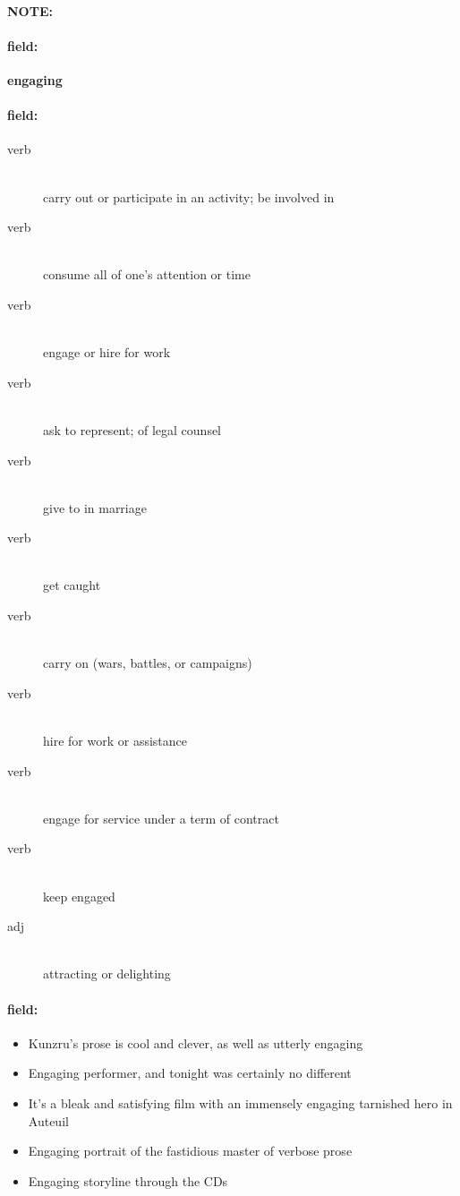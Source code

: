 \documentclass[12pt]{article}
\newenvironment{note}{\paragraph{NOTE:}}{}
\newenvironment{field}{\paragraph{field:}}{}
\begin{document}
\begin{note}
\begin{field}
\textbf{\large engaging}
\end{field}


\begin{field}
\begin{description}
\item[verb] \hfill \\ 
carry out or participate in an activity; be involved in

\item[verb] \hfill \\ 
consume all of one's attention or time

\item[verb] \hfill \\ 
engage or hire for work

\item[verb] \hfill \\ 
ask to represent; of legal counsel

\item[verb] \hfill \\ 
give to in marriage

\item[verb] \hfill \\ 
get caught

\item[verb] \hfill \\ 
carry on (wars, battles, or campaigns)

\item[verb] \hfill \\ 
hire for work or assistance

\item[verb] \hfill \\ 
engage for service under a term of contract

\item[verb] \hfill \\ 
keep engaged

\item[adj] \hfill \\ 
attracting or delighting

\end{description}
\end{field}

\begin{field}
\begin{itemize}
\item Kunzru's prose is cool and clever, as well as utterly engaging
\item Engaging performer, and tonight was certainly no different
\item It's a bleak and satisfying film with an immensely engaging tarnished hero in Auteuil
\item Engaging portrait of the fastidious master of verbose prose
\item Engaging storyline through the CDs
\end{itemize}
\end{field}
\end{note}
\end{document}

